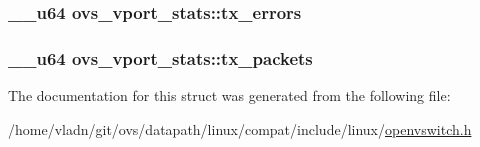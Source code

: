 \subsubsection[{tx\+\_\+errors}]{\setlength{\rightskip}{0pt plus 5cm}\+\_\+\+\_\+u64 ovs\+\_\+vport\+\_\+stats\+::tx\+\_\+errors}\label{structovs__vport__stats_ac0233ed277e2568b4471479beaa4b642}
\hypertarget{structovs__vport__stats_adb91be6e2d6695cb19acc87d817191c5}{}
\subsubsection[{tx\+\_\+packets}]{\setlength{\rightskip}{0pt plus 5cm}\+\_\+\+\_\+u64 ovs\+\_\+vport\+\_\+stats\+::tx\+\_\+packets}\label{structovs__vport__stats_adb91be6e2d6695cb19acc87d817191c5}


The documentation for this struct was generated from the following file\+:\begin{DoxyCompactItemize}
\item 
/home/vladn/git/ovs/datapath/linux/compat/include/linux/\hyperlink{openvswitch_8h}{openvswitch.\+h}\end{DoxyCompactItemize}
